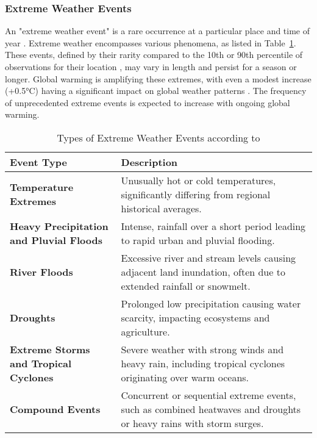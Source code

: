 \subsubsection{Extreme Weather Events}
\label{subsubsec:extreme-weather}
An "extreme weather event" is a rare occurrence at a particular place and time of year \parencite[2908]{ipcc_2023_wg2_full}. Extreme weather encompasses various phenomena, as listed in Table~\ref{tab:extreme_weather_events}. These events, defined by their rarity compared to the 10th or 90th percentile of observations for their location \parencite[2908]{ipcc_2023_wg2_full}, may vary in length and persist for a season or longer. Global warming is amplifying these extremes, with even a modest increase (+0.5°C) having a significant impact on global weather patterns \parencite[1583]{ipcc2023_wg1_11}. The frequency of unprecedented extreme events is expected to increase with ongoing global warming.

\begin{table}[ht]
\centering
\renewcommand{\arraystretch}{1.5}
\begin{tabularx}{\linewidth}{|l|X|} %
\hline
\rowcolor{gray!50}
\textbf{Event Type} & \textbf{Description} \\ \hline
\textbf{Temperature Extremes} & Unusually hot or cold temperatures, significantly differing from regional historical averages.\\ \hline

\textbf{Heavy Precipitation and Pluvial Floods} & Intense, rainfall over a short period leading to rapid urban and pluvial flooding.\\ \hline

\textbf{River Floods} & Excessive river and stream levels causing adjacent land inundation, often due to extended rainfall or snowmelt. \\ \hline

\textbf{Droughts} & Prolonged low precipitation causing water scarcity, impacting ecosystems and agriculture. \\ \hline

\textbf{Extreme Storms and Tropical Cyclones} & Severe weather with strong winds and heavy rain, including tropical cyclones originating over warm oceans. \\ \hline

\textbf{Compound Events} & Concurrent or sequential extreme events, such as combined heatwaves and droughts or heavy rains with storm surges. \\ \hline

\end{tabularx}
\caption[Types of Extreme Weather Events]{Types of Extreme Weather Events according to \textcite{ipcc_2023_policy}}
\label{tab:extreme_weather_events}
\end{table}


